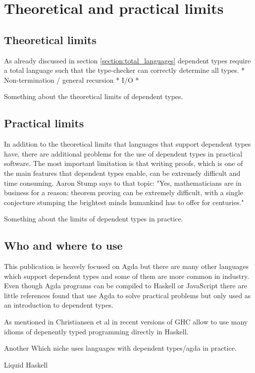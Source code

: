 \section{Theoretical and practical limits}
\subsection{Theoretical limits}
As already discussed in section \ref{section:total_languages} dependent types require a total language such that the type-checker can correctly determine all types.
* Non-termination / general recursion
* I/O
* 

Something about the theoretical limits of dependent types.
\subsection{Practical limits}
In addition to the theoretical limits that languages that support dependent types have, there are additional problems for the use of dependent types in practical software.
The most important limitation is that writing proofs, which is one of the main features that dependent types enable, can be extremely difficult and time consuming.
Aaron Stump says to that topic: "Yes, mathematicians are in business for a reason: theorem proving can be extremely difficult, with a single conjecture stumping the brightest minds humankind has to offer for centuries." \cite{10.1145/2841316}

Something about the limits of dependent types in practice.
\subsection{Who and where to use}
This publication is heavely focused on Agda but there are many other languages which support dependent types and some of them are more common in industry.
Even though Agda programs can be compiled to Haskell or JavaScript there are little references found that use Agda to solve practical problems but only used as an introduction to dependent types.

As mentioned in Christiansen et al in \cite{10.1145/3341704} recent versions of GHC allow to use many idioms of depenently typed programming directly in Haskell.

Another 
Which niche uses languages with dependent types/agda in practice.

Liquid Haskell \cite{DBLP:journals/corr/abs-1711-03842, 10.1145/3299711.3242756}

